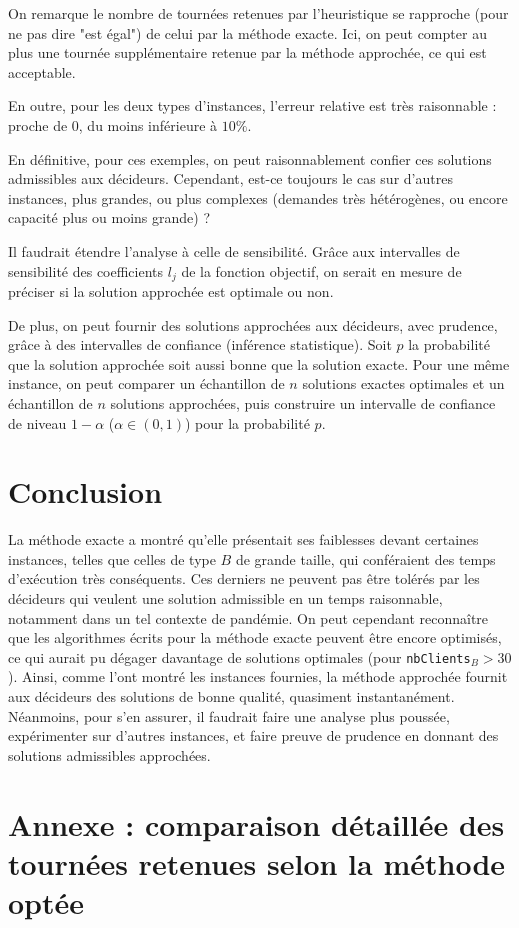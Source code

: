 \documentclass[french, 11pt, a4paper]{article} %
\newcommand{\smb}{\smallbreak}
\begin{document}
On remarque le nombre de tournées retenues par l'heuristique
se rapproche (pour ne pas dire "est égal") de celui par la méthode exacte. Ici, on peut compter au plus
une tournée supplémentaire retenue par la méthode approchée, ce qui est acceptable.

\smb En outre, pour les deux types d'instances, l'erreur relative est très raisonnable : proche de $0$,
du moins inférieure à $10 \%$.

\smb En définitive, pour ces exemples, on peut raisonnablement confier ces solutions admissibles aux décideurs. 
Cependant, est-ce toujours le cas sur d'autres instances, plus grandes, ou plus complexes
(demandes très hétérogènes, ou encore capacité plus ou moins grande) ?

\smb Il faudrait étendre l'analyse à celle de sensibilité. Grâce aux intervalles de sensibilité des coefficients $l_j$
de la fonction objectif, on serait en mesure de préciser si la solution approchée est optimale ou non.

\smb De plus, on peut fournir des solutions approchées aux décideurs, avec prudence, grâce à des intervalles de confiance
(inférence statistique). Soit $p$ la probabilité que la solution approchée soit aussi bonne que la solution exacte.
Pour une même instance, on peut comparer un échantillon de $n$ solutions exactes optimales
et un échantillon de $n$ solutions approchées, puis construire un intervalle de confiance de niveau $1-\alpha$ ($\alpha \in (0,1)$) pour la probabilité $p$.

\section{Conclusion}

La méthode exacte a montré qu'elle présentait ses faiblesses devant certaines instances, telles que celles de type
$B$ de grande taille, qui conféraient des temps d'exécution très conséquents. Ces derniers ne peuvent pas être
tolérés par les décideurs qui veulent une solution admissible en un temps raisonnable, notamment
dans un tel contexte de pandémie. On peut cependant reconnaître que les algorithmes écrits pour la méthode exacte
peuvent être encore optimisés, ce qui aurait pu dégager davantage de solutions optimales (pour \verb+nbClients+$_B > 30$).
\smb Ainsi, comme l'ont montré les instances fournies, 
la méthode approchée fournit aux décideurs des solutions de bonne qualité,
quasiment instantanément. Néanmoins, pour s'en assurer, il faudrait faire une analyse plus poussée,
expérimenter sur d'autres instances, et faire preuve de prudence en donnant des solutions admissibles
approchées.




\newpage

\section*{Annexe : comparaison détaillée des tournées retenues selon la méthode optée}
\end{document}
